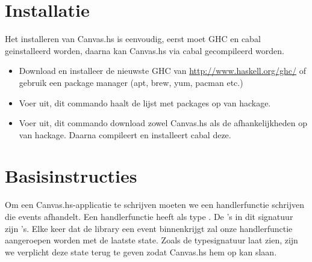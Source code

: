 \section{Installatie}

Het installeren van Canvas.hs is eenvoudig, eerst moet GHC en cabal geinstalleerd worden, daarna kan Canvas.hs via cabal gecompileerd worden.

\begin{itemize}
    \item Download en installeer de nieuwste GHC van \url{http://www.haskell.org/ghc/} of gebruik een package manager (apt, brew, yum, pacman etc.)
    \item Voer  uit, dit commando haalt de lijst met packages op van hackage.
    \item Voer  uit, dit commando download zowel Canvas.hs als de afhankelijkheden op van hackage. Daarna compileert en installeert cabal deze.
\end{itemize}

\section{Basisinstructies}

Om een Canvas.hs-applicatie te schrijven moeten we een handlerfunctie schrijven die events afhandelt. Een handlerfunctie heeft als type . De 's in dit signatuur zijn 's. Elke keer dat de library een event binnenkrijgt zal onze handlerfunctie aangeroepen worden met de laatste state. Zoals de typesignatuur laat zien, zijn we verplicht deze state terug te geven zodat Canvas.hs hem op kan slaan.

